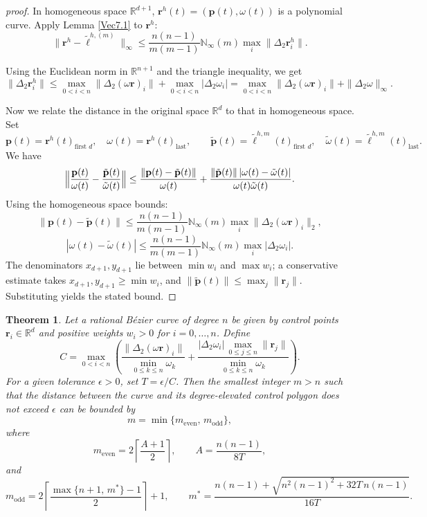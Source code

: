 \documentclass[preprint,12pt]{elsarticle}
\newtheorem{Theorem}{Theorem}
\begin{document}
\begin{proof}[proof]
  In homogeneous space $\mathbb{R}^{d+1}$, $\mathbf{r}^h(t) = \left(\mathbf{p}(t), \omega (t)\right)$ is a polynomial curve. Apply Lemma \ref{Vec7.1} to $\mathbf{r}^h$:
  \[
  \|\mathbf{r}^h-\tilde{\bm{\ell}}^{h,(m)}\|_\infty\le\frac{n(n-1)}{m(m-1)}\mathbb{N}_{\infty}(m)\max_i\|\Delta_2\mathbf{r}_i^h\|.
  \]
  
  Using the Euclidean norm in $\mathbb{R}^{n+1}$ and the triangle inequality, we get
\[
\|\Delta_2\mathbf{r}_i^h\|
\le \max_{0<i<n}\|\Delta_2(\omega\mathbf{r})_i\| + \max_{0<i<n}|\Delta_2 \omega_i|
= \max_{0<i<n}\|\Delta_2(\omega\mathbf{r})_i\| + \|\Delta_2 \omega\|_{\infty}.
\]
  
  Now we relate the distance in the original space $\mathbb{R}^d$ to that in homogeneous space.
  Set
\[
\mathbf{p}(t)=\mathbf{r}^h(t)_{\text{first }d}, \quad  \omega(t)=\mathbf{r}^h(t)_{\text{last}},
\qquad
\tilde{\mathbf{p}}(t)=\tilde{\bm{\ell}}^{h,m}(t)_{\text{first }d},\quad \tilde{\omega}(t)= \tilde{\bm{\ell}}^{h,m}(t)_{\text{last}}.
\]
  We have
  \[
  \Bigl\|\frac{\mathbf{p}(t)}{\omega(t)}-\frac{\tilde{\mathbf{p}}(t)}{\tilde{\omega}(t)}\Bigr\|
  \le\frac{\|\mathbf{p}(t)-{\tilde{\mathbf{p}}(t)}\|}{\omega(t)}+\frac{\|{\tilde{\mathbf{p}}(t)}\|\,|\omega(t)-\tilde{\omega}(t)|}{\omega(t)\tilde{\omega}(t)}.
  \]
  Using the homogeneous space bounds:
  \[
  \|\mathbf{p}(t)-\tilde{\mathbf{p}}(t)\|\le\frac{n(n-1)}{m(m-1)}\mathbb{N}_{\infty}(m)\max_i\|\Delta_2(\omega\mathbf{r})_i\|_2,
  \]
  \[
  |\omega(t)-\tilde{\omega}(t)|\le\frac{n(n-1)}{m(m-1)}\mathbb{N}_{\infty}(m)\max_i|\Delta_2 \omega_i|.
  \]
  The denominators $x_{d+1},y_{d+1}$ lie between $\min w_i$ and $\max w_i$; a conservative estimate takes $x_{d+1},y_{d+1}\ge\min w_i$, and $\|\tilde{\mathbf{p}}(t)\|\le\max_j\|\mathbf{r}_j\|$. Substituting yields the stated bound.
\end{proof}

\begin{Theorem}
Let a rational B\'ezier curve of degree \(n\) be given by control points \(\mathbf{r}_i \in \mathbb{R}^d\) and positive weights \(w_i > 0\) for \(i = 0, \dots, n\). Define
\[
C = \max_{0 < i < n} \left( \frac{\|\Delta_2(\omega\mathbf{r})_i\|}{\displaystyle\min_{0\le k\le n} \omega_k} + \frac{|\Delta_2 \omega_i| \,\displaystyle\max_{0\le j\le n} \|\mathbf{r}_j\|}{\displaystyle\min_{0\le k\le n} \omega_k} \right).
\]
For a given tolerance \(\epsilon > 0\), set \(T = \epsilon / C\). Then the smallest integer \(m > n\) such that the distance between the curve and its degree‑elevated control polygon does not exceed \(\epsilon\) can be bounded by
\[
m = \min\{ m_{\text{even}},\, m_{\text{odd}} \},
\]
where
\[
m_{\text{even}} = 2\left\lceil \frac{A+1}{2} \right\rceil,\qquad
A = \frac{n(n-1)}{8T},
\]
and
\[
m_{\text{odd}} = 2\left\lceil \frac{\max\{n+1,\, m^*\} - 1}{2} \right\rceil + 1,\qquad
m^* = \frac{n(n-1) + \sqrt{n^2(n-1)^2 + 32T\, n(n-1)}}{16T}.
\]
\end{Theorem}
\end{document}
